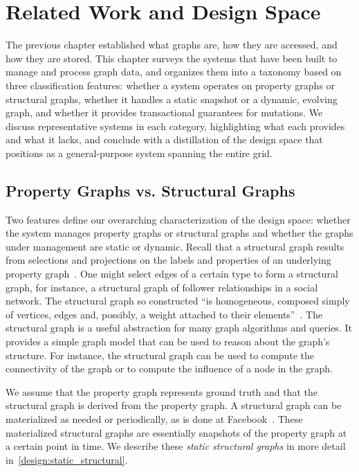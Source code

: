 \chapter{Related Work and Design Space}
\label{chap:design_space}
\label{sec:related-work}

The previous chapter established what graphs are, how they are accessed, and how they are stored.
This chapter surveys the systems that have been built to manage and process graph data, and organizes them into a taxonomy based on three classification features: whether a system operates on property graphs or structural graphs, whether it handles a static snapshot or a dynamic, evolving graph, and whether it provides transactional guarantees for mutations.
We discuss representative systems in each category, highlighting what each provides and what it lacks, and conclude with a distillation of the design space that positions \project{} as a general-purpose system spanning the entire grid.


\section{Property Graphs vs. Structural Graphs}
\label{design:property_vs_structural}
Two features define our overarching characterization of the design space: whether the system manages property graphs or structural graphs and whether the graphs under management are static or dynamic.
Recall that a structural graph results from selections and projections on the labels and properties of an underlying property graph~\cite{RodriguezNeubauer2010}.
One might select edges of a certain type to form a structural graph, for instance, a structural graph of follower relationships in a social network.
The structural graph so constructed ``is homogeneous, composed simply of vertices, edges and, possibly, a weight attached to their elements''~\cite[Section 1]{teseo2021deLeo}.
The structural graph is a useful abstraction for many graph algorithms and queries. It provides a simple graph model that can be used to reason about the graph's structure.
For instance, the structural graph can be used to compute the connectivity of the graph or to compute the influence of a node in the graph.

We assume that the property graph represents ground truth and that the structural graph is derived from the property graph.
A structural graph can be materialized as needed or periodically, as is done at Facebook~\cite{curtiss2013unicorn}.
These materialized structural graphs are essentially snapshots of the property graph at a certain point in time.
We describe these \emph{static structural graphs} in more detail in~\autoref{design:static_structural}.

